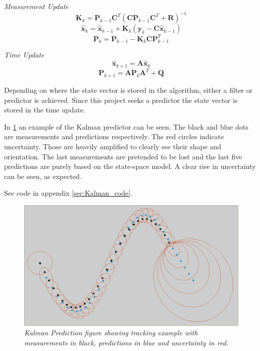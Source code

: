 \emph{Measurement Update}
\begin{equation}
	\textbf{K}_{k} = \textbf{P}_{k-1}\textbf{C}^T(\textbf{C}\textbf{P}_{k-1}\textbf{C}^T + \textbf{R})^{-1}
\end{equation}
\begin{equation}
	\hat{\textbf{x}}_k = \hat{\textbf{x}}_{k-1} + \textbf{K}_k (\textbf{y}_k - \textbf{C}\hat{\textbf{x}}_{k-1})
\end{equation}
\begin{equation}
	\textbf{P}_k = \textbf{P}_{k-1} - \textbf{K}_k\textbf{C}\textbf{P}_{k-1}^T
\end{equation}

\emph{Time Update}
\begin{equation}
	\hat{\textbf{x}}_{k+1} = \textbf{A}\hat{\textbf{x}}_{k}
\end{equation}
\begin{equation}
	\textbf{P}_{k+1} = \textbf{A}\textbf{P}_{k}\textbf{A}^T + \textbf{Q}
\end{equation}

Depending on where the state vector is stored in the algorithm, either a filter or predictor is achieved. Since this project seeks a predictor the state vector is stored in the time update.

In \ref{fig:kalman_fig} an example of the Kalman predictor can be seen. The black and blue dots are measurements and predictions respectively. The red circles indicate uncertainty. Those are heavily amplified to clearly see their shape and orientation. The last measurements are pretended to be lost and the last five predictions are purely based on the state-space model. A clear rise in uncertainty can be seen, as expected. 
 
See code in appendix \ref{sec:Kalman_code}. %

\begin{figure}[h]
	\centering
	\includegraphics[width=\linewidth]{images/Kalmask2}
	\caption{\textit{Kalman Prediction figure showing tracking example with measurements in black, predictions in blue and uncertainty in red.}}
	\label{fig:kalman_fig} %
\end{figure}
\pagebreak